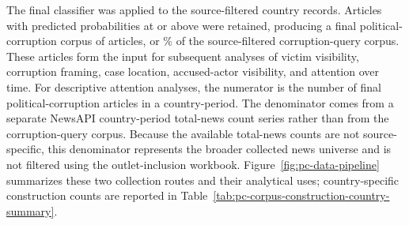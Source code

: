 The final classifier was applied to the \PCSourceFilteredN{} source-filtered country records. Articles with predicted probabilities at or above \PCThreshold{} were retained, producing a final political-corruption corpus of \PCFinalN{} articles, or \PCFinalShare\% of the source-filtered corruption-query corpus. These articles form the input for subsequent analyses of victim visibility, corruption framing, case location, accused-actor visibility, and attention over time. For descriptive attention analyses, the numerator is the number of final political-corruption articles in a country-period. The denominator comes from a separate NewsAPI country-period total-news count series rather than from the corruption-query corpus. Because the available total-news counts are not source-specific, this denominator represents the broader collected news universe and is not filtered using the outlet-inclusion workbook. Figure~\ref{fig:pc-data-pipeline} summarizes these two collection routes and their analytical uses; country-specific construction counts are reported in Table~\ref{tab:pc-corpus-construction-country-summary}.
